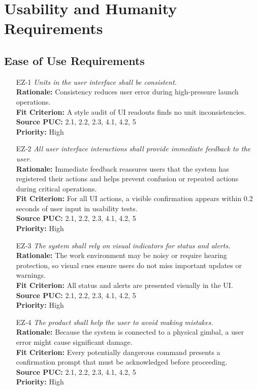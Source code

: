 \documentclass[12pt]{article}
\begin{document}
\section{Usability and Humanity Requirements}
\subsection{Ease of Use Requirements}
\begin{itemize}[leftmargin=*]
  \item[EZ-1] \emph{Units in the user interface shall be consistent.}\\[2mm]
        \textbf{Rationale:} Consistency reduces user error during high-pressure launch operations.\\
        \textbf{Fit Criterion:} A style audit of UI readouts finds no unit inconsistencies.\\
        \textbf{Source PUC:} 2.1, 2.2, 2.3, 4.1, 4.2, 5 \\
        \textbf{Priority:} High

  \item[EZ-2] \emph{All user interface interactions shall provide immediate feedback to
          the user.}\\[2mm]
        \textbf{Rationale:} Immediate feedback reassures users that the system has registered their actions and helps prevent confusion or repeated actions during critical operations.\\
        \textbf{Fit Criterion:} For all UI actions, a visible confirmation appears within 0.2 seconds of user input in usability tests.\\
        \textbf{Source PUC:} 2.1, 2.2, 2.3, 4.1, 4.2, 5 \\
        \textbf{Priority:} High

  \item[EZ-3] \emph{The system shall rely on visual indicators for status and alerts.}\\[2mm]
        \textbf{Rationale:} The work environment may be noisy or require hearing protection, so visual cues ensure users do not miss important updates or warnings.\\
        \textbf{Fit Criterion:} All status and alerts are presented visually in the UI.\\
        \textbf{Source PUC:} 2.1, 2.2, 2.3, 4.1, 4.2, 5 \\
        \textbf{Priority:} High
  \item[EZ-4] \emph{The product shall help the user to avoid making mistakes.}\\[2mm]
        \textbf{Rationale:} Because the system is connected to a physical gimbal, a user error might cause significant damage.\\
        \textbf{Fit Criterion:} Every potentially dangerous command presents a confirmation prompt that must be acknowledged before proceeding.\\
        \textbf{Source PUC:} 2.1, 2.2, 2.3, 4.1, 4.2, 5 \\
        \textbf{Priority:} High
\end{itemize}
\end{document}
